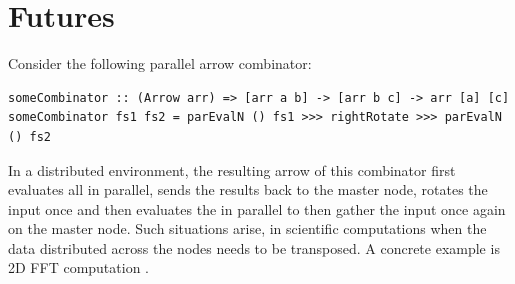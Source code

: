 \section{Futures} \label{futures}
Consider the following  parallel arrow combinator:
\begin{lstlisting}[frame=htrbl]
someCombinator :: (Arrow arr) => [arr a b] -> [arr b c] -> arr [a] [c]
someCombinator fs1 fs2 = parEvalN () fs1 >>> rightRotate >>> parEvalN () fs2
\end{lstlisting}
In a distributed environment, the resulting arrow of this combinator first evaluates all \code{[arr a b]} in parallel, sends the results back to the master node, rotates the input once and then evaluates the \code{[arr b c]} in parallel to then gather the input once again on the master node. 
Such situations arise, \eg in scientific computations when the data distributed across the nodes needs to be transposed. A concrete example is 2D FFT computation \cite{Gorlatch,pact-fft}.

